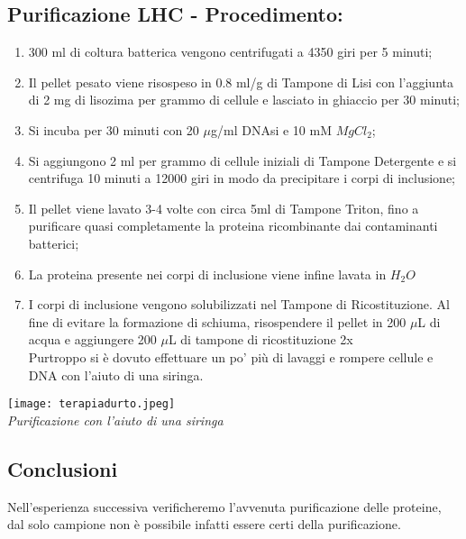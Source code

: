 \documentclass{extarticle}
\begin{document}
\begin{minipage}{0.50 \textwidth}
\subsection*{Purificazione LHC - Procedimento:}
    \begin{enumerate}
        \item 300 ml di coltura batterica  vengono centrifugati a 4350 giri per 5 minuti;
        \item Il pellet pesato viene risospeso in 0.8 ml/g di Tampone di Lisi con l'aggiunta di 2 mg di lisozima per grammo di cellule e lasciato in ghiaccio per 30 minuti; 
        \item Si incuba per 30 minuti con 20 $\mu$g/ml DNAsi e 10 mM $MgCl_{2}$;
        \item Si aggiungono 2 ml per grammo di cellule iniziali di Tampone Detergente e si centrifuga 10 minuti a 12000 giri in modo da precipitare i corpi di inclusione;
        \item Il pellet viene lavato 3-4 volte con circa 5ml di Tampone Triton, fino a purificare quasi completamente la proteina ricombinante dai contaminanti batterici;
        \item La proteina presente nei corpi di inclusione viene infine lavata in $H_{2}O$ 
        \item I corpi di inclusione vengono solubilizzati nel Tampone di Ricostituzione. Al fine di evitare la formazione di schiuma, risospendere il pellet in 200 $\mu$L di acqua e aggiungere 200 $\mu$L di tampone di ricostituzione 2x\\
        Purtroppo si è dovuto effettuare un po' più di lavaggi e rompere cellule e DNA con l'aiuto di una siringa.
    \end{enumerate}
\end{minipage} \hfill
\begin{minipage}{0.50 \textwidth}
    \begin{center}
        \texttt{[image: terapiadurto.jpeg]}\\
        \emph{Purificazione con l'aiuto di una siringa}
    \end{center}
\end{minipage}
\subsection*{Conclusioni}
Nell'esperienza successiva verificheremo l'avvenuta purificazione delle proteine, dal solo campione non è possibile infatti essere certi della purificazione.
\end{document}

